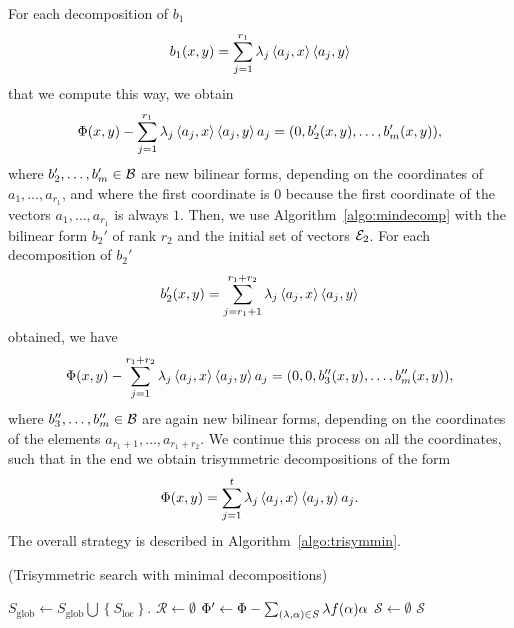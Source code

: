For each decomposition of $b_1$
\[
  b_1(x, y) = \sum_{j=1}^{r_1}\lambda_j\left\langle a_j,x\right\rangle\left\langle a_j,y\right\rangle
\]
that we compute this way, we obtain
\[
  \Phi(x, y) - \sum_{j=1}^{r_1}\lambda_j\left\langle a_j,x\right\rangle\left\langle a_j,y\right\rangle a_j = (0, b_2'(x,
  y), \dots, b_m'(x, y)),
\]
where $b_2', \dots, b_m'\in\mathcal{B}$ are new bilinear forms, depending on the coordinates
of $a_1, \dots, a_{r_1}$, and where the first coordinate is $0$ because the
first coordinate of the vectors $a_1, \dots, a_{r_1}$ is always $1$. Then, we
use Algorithm~\ref{algo:mindecomp} with the bilinear form $b_2'$ of rank $r_2$ and the initial
set of vectors $\mathcal{E}_2$. For each decomposition of $b_2'$
\[
  b_2'(x, y) = \sum_{j=r_{1}+1}^{r_1+r_2}\lambda_j\left\langle a_j,x\right\rangle\left\langle a_j,y\right\rangle
\]
obtained, we have
\[
  \Phi(x, y) - \sum_{j=1}^{r_1+r_2}\lambda_j\left\langle a_j,x\right\rangle\left\langle a_j,y\right\rangle a_j = (0, 0,
  b_3''(x, y), \dots, b_m''(x, y)),
\]
where $b_3'', \dots, b_m''\in\mathcal{B}$ are again new bilinear forms, depending on the
coordinates of the elements $a_{r_1+1}, \dots, a_{r_1+r_2}$. We continue this
process on all the coordinates, such that in the end we obtain trisymmetric
decompositions of the form
\[
  \Phi(x, y) = \sum_{j=1}^t\lambda_j\left\langle a_j,x\right\rangle\left\langle a_j,y\right\rangle a_j.
\]
The overall strategy is described in Algorithm~\ref{algo:trisymmin}.
\begin{algorithm}
  \caption{(Trisymmetric search with minimal
  decompositions)}\label{algo:trisymmin}
  \begin{algorithmic}[1]

      \State $S_\text{glob}\gets S_\text{glob}\bigcup \left\{S_\text{loc}\right\}$.
        \State $\mathcal R\gets\emptyset$
        \State {}
        \State $\Phi'\gets\Phi-\sum_{(\lambda, \alpha)\in
        S}\lambda f(\alpha)\alpha$
        \State {}
        \EndFor
      \EndIf
    \EndProcedure
    \State $\mathcal S\gets\emptyset$
    \State {}
    \State \Return $\mathcal S$
  \end{algorithmic}
\end{algorithm}

